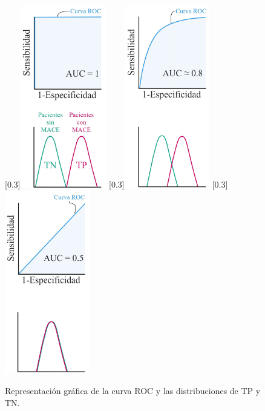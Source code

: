 \begin{figure}[h!]
	\centering
  	[0.3\linewidth]{\includegraphics[height=8cm]{./Figures/ROC_a.jpg}}
	\hspace{1em}
	[0.3\linewidth]{\includegraphics[height=8cm]{./Figures/ROC_b.jpg}}
	\hspace{1em}
	[0.3\linewidth]{\includegraphics[height=8cm]{./Figures/ROC_c.jpg}}
	\caption{Representación gráfica de la curva ROC y las distribuciones de TP y TN\protect\footnotemark.}
\end{figure}

